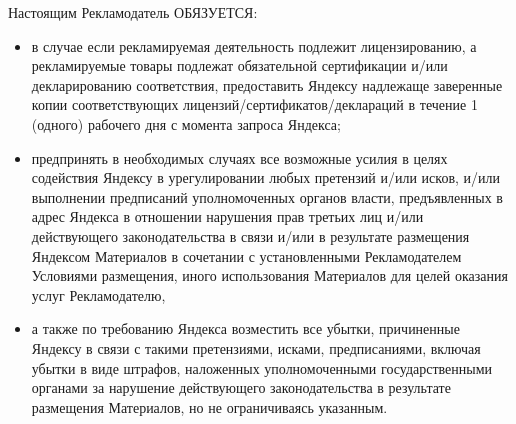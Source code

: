 \noindent
    Настоящим Рекламодатель ОБЯЗУЕТСЯ:
\begin{itemize}
    \item в случае если рекламируемая деятельность подлежит лицензированию, а рекламируемые товары подлежат обязательной сертификации и/или декларированию соответствия, предоставить Яндексу надлежаще заверенные копии соответствующих лицензий/сертификатов/деклараций в течение 1 (одного) рабочего дня с момента запроса Яндекса;
    \item предпринять в необходимых случаях все возможные усилия в целях содействия Яндексу в урегулировании любых претензий и/или исков, и/или выполнении предписаний уполномоченных органов власти, предъявленных в адрес Яндекса в отношении нарушения прав третьих лиц и/или действующего законодательства в связи и/или в результате размещения Яндексом Материалов в сочетании с установленными Рекламодателем Условиями размещения, иного использования Материалов для целей оказания услуг Рекламодателю,
    \item а также по требованию Яндекса возместить все убытки, причиненные Яндексу в связи с такими претензиями, исками, предписаниями, включая убытки в виде штрафов, наложенных уполномоченными государственными органами за нарушение действующего законодательства в результате размещения Материалов, но не ограничиваясь указанным.
\end{itemize}

